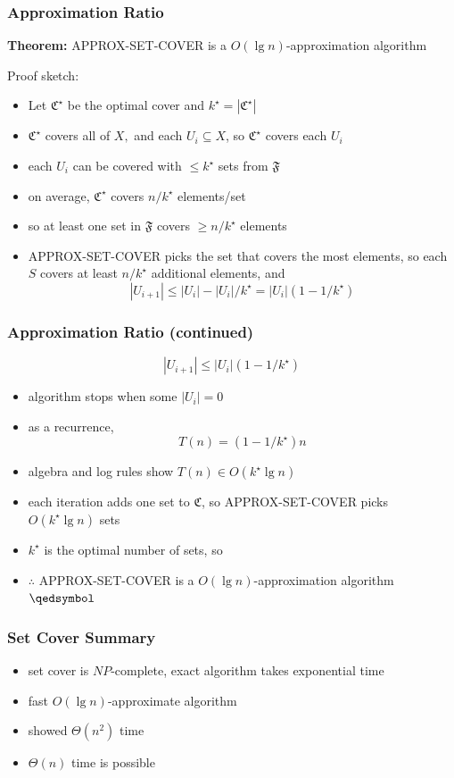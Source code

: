 \documentclass{beamer}
\begin{document}
\begin{frame} \frametitle{Approximation Ratio}
\textbf{Theorem:} APPROX-SET-COVER is a $O(\lg n)$-approximation algorithm

Proof sketch:
\begin{itemize}
  \item Let $\mathfrak{C}^\star$ be the optimal cover and $k^\star=|\mathfrak{C}^\star|$
  \item $\mathfrak{C}^\star$ covers all of $X,$ and each $U_i \subseteq X$, so $\mathfrak{C}^\star$ covers each $U_i$
  \item each $U_i$ can be covered with $\leq k^\star$ sets from $\mathfrak{F}$
  \item on average, $\mathfrak{C}^\star$ covers $n/k^\star$ elements/set
  \item so at least one set in $\mathfrak{F}$ covers $\geq n/k^\star$ elements
  \item APPROX-SET-COVER picks the set that covers the most elements, so each $S$ covers at least $n/k^\star$ additional elements,
    and \[ |U_{i+1}| \leq |U_i| - |U_i|/k^\star = |U_i|(1-1/k^\star) \]
\end{itemize}
\end{frame}

\begin{frame} \frametitle{Approximation Ratio (continued)}
  \[ |U_{i+1}| \leq |U_i|(1-1/k^\star) \]
  \begin{itemize}
    \item algorithm stops when some $|U_i|=0$
    \item as a recurrence,
      \[ T(n) = (1-1/k^\star)n \]
    \item algebra and log rules show $T(n) \in O(k^\star \lg n)$
    \item each iteration adds one set to $\mathfrak{C}$, so APPROX-SET-COVER picks $O(k^\star \lg n)$ sets
    \item $k^\star$ is the optimal number of sets, so
    \item $\therefore$ APPROX-SET-COVER is a $O(\lg n)$-approximation algorithm $\qedsymbol$
  \end{itemize}
  \end{frame}
  
\begin{frame} \frametitle{Set Cover Summary}
\begin{itemize}
  \item set cover is $NP$-complete, exact algorithm takes exponential time
  \item fast $O(\lg n)$-approximate algorithm
  \item showed $\Theta(n^2)$ time
  \item $\Theta(n)$ time is possible
\end{itemize}
\end{frame}
\end{document}
